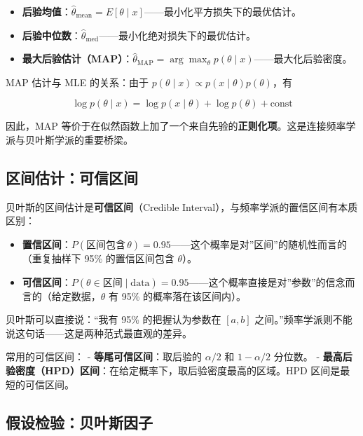 \documentclass[
]{book}
\providecommand{\tightlist}{%
  \setlength{\itemsep}{0pt}\setlength{\parskip}{0pt}}
\begin{document}
\begin{itemize}
\tightlist
\item
  \textbf{后验均值}：\(\hat{\theta}_{\text{mean}} = E[\theta \mid x]\)------最小化平方损失下的最优估计。
\item
  \textbf{后验中位数}：\(\hat{\theta}_{\text{med}}\)------最小化绝对损失下的最优估计。
\item
  \textbf{最大后验估计（MAP）}：\(\hat{\theta}_{\text{MAP}} = \arg\max_\theta p(\theta \mid x)\)------最大化后验密度。
\end{itemize}

MAP 估计与 MLE 的关系：由于 \(p(\theta \mid x) \propto p(x \mid \theta) p(\theta)\)，有

\[\log p(\theta \mid x) = \log p(x \mid \theta) + \log p(\theta) + \text{const}\]

因此，MAP 等价于在似然函数上加了一个来自先验的\textbf{正则化项}。这是连接频率学派与贝叶斯学派的重要桥梁。

\subsection{区间估计：可信区间}\label{ux533aux95f4ux4f30ux8ba1ux53efux4fe1ux533aux95f4}

贝叶斯的区间估计是\textbf{可信区间}（Credible Interval），与频率学派的置信区间有本质区别：

\begin{itemize}
\tightlist
\item
  \textbf{置信区间}：\(P(\text{区间包含} \, \theta) = 0.95\)------这个概率是对''区间''的随机性而言的（重复抽样下 95\% 的置信区间包含 \(\theta\)）。
\item
  \textbf{可信区间}：\(P(\theta \in \text{区间} \mid \text{data}) = 0.95\)------这个概率直接是对''参数''的信念而言的（给定数据，\(\theta\) 有 95\% 的概率落在该区间内）。
\end{itemize}

贝叶斯可以直接说：``我有 95\% 的把握认为参数在 \([a, b]\) 之间。''频率学派则不能说这句话------这是两种范式最直观的差异。

常用的可信区间：
- \textbf{等尾可信区间}：取后验的 \(\alpha/2\) 和 \(1-\alpha/2\) 分位数。
- \textbf{最高后验密度（HPD）区间}：在给定概率下，取后验密度最高的区域。HPD 区间是最短的可信区间。

\subsection{假设检验：贝叶斯因子}\label{ux5047ux8bbeux68c0ux9a8cux8d1dux53f6ux65afux56e0ux5b50}
\end{document}
